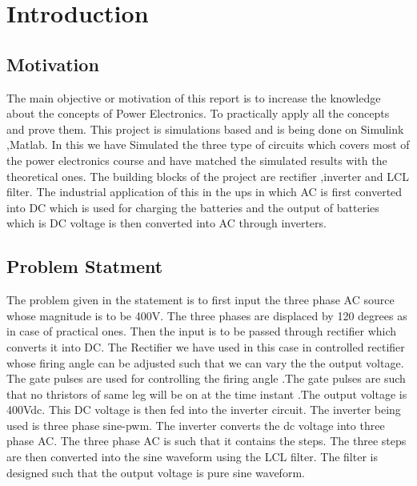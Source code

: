 
\chapter{Introduction} %
\label{Chapter0}

\section{Motivation}
The main objective or motivation of this report is to increase the knowledge about the concepts of Power Electronics. To practically apply all the concepts and prove them. This project is simulations based and is being done on Simulink ,Matlab. In this we have Simulated the three type of circuits which covers most of the power electronics course and have matched the simulated results with the theoretical ones. The building blocks of the project are rectifier ,inverter and LCL filter. The industrial application of this in the ups in which AC is first converted into DC which is used for charging the batteries and the output of batteries which is DC voltage is then converted into AC through inverters. 

\section{Problem Statment}
The problem given in the statement is to first input the three phase AC source whose magnitude is to be 400V. The three phases are displaced by 120 degrees as in case of practical ones. Then the input is to be passed through rectifier which converts it into DC. The Rectifier we have used in this case in controlled rectifier whose firing angle  can be adjusted such that we can vary the the output voltage. The gate pulses are used for controlling the firing angle .The gate pulses are such that no thristors of same leg will be on at the time instant  .The output voltage is 400Vdc. This DC voltage is then fed into the inverter circuit. The inverter being used is three phase sine-pwm. The inverter converts the dc voltage into three phase AC. The three phase AC is such that it contains the steps. The three steps are then converted into the sine waveform using the LCL filter. The filter is designed such that the output voltage is pure sine waveform.    
